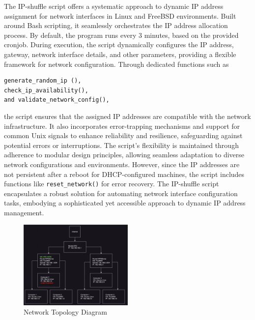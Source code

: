 The IP-shuffle script offers a systematic approach to dynamic IP address assignment for network interfaces in Linux and FreeBSD environments. Built around Bash scripting, it seamlessly orchestrates the IP address allocation process. By default, the program runs every 3 minutes, based on the provided cronjob. During execution, the script dynamically configures the IP address, gateway, network interface details, and other parameters, providing a flexible framework for network configuration. Through dedicated functions such as
\begin{verbatim}
generate_random_ip (), 
check_ip_availability(), 
and validate_network_config(), 
\end{verbatim}
the script ensures that the assigned IP addresses are compatible with the network infrastructure. It also incorporates error-trapping mechanisms and support for common Unix signals to enhance reliability and resilience, safeguarding against potential errors or interruptions. The script's flexibility is maintained through adherence to modular design principles, allowing seamless adaptation to diverse network configurations and environments. However, since the IP addresses are not persistent after a reboot for DHCP-configured machines, the script includes functions like \texttt{reset\_network()} for error recovery. The IP-shuffle script encapsulates a robust solution for automating network interface configuration tasks, embodying a sophisticated yet accessible approach to dynamic IP address management.

\label{sec:figs}


\begin{figure}
 \caption{Network Topology Diagram}
  \centering
   \includegraphics[width=0.5\textwidth]{diagram.png}
\end{figure}

 




